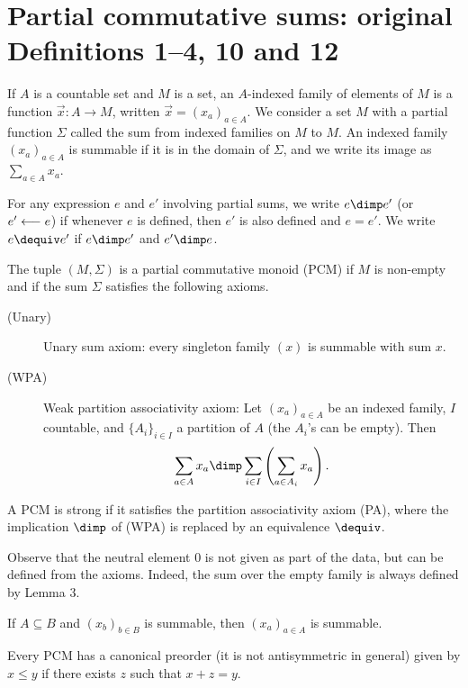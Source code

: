 \section*{Partial commutative sums: original Definitions 1--4, 10 and 12}
If $A$ is a countable set and $M$ is a set, an $A$-indexed family of elements of $M$ is a function $\vec x:A\to M$, written $\vec x=(x_a)_{a\in A}$. We consider a set $M$ with a partial function $\Sigma$ called the sum from indexed families on $M$ to $M$. An indexed family $(x_a)_{a\in A}$ is summable if it is in the domain of $\Sigma$, and we write its image as $\sum_{a\in A}x_a$.
\begin{originaldef}[1]
For any expression $e$ and $e'$ involving partial sums, we write $e\dimp e'$ (or $e'\mathrel{\leftarrow\joinrel\relbar}e$) if whenever $e$ is defined, then $e'$ is also defined and $e=e'$. We write $e\dequiv e'$ if $e\dimp e'$ and $e'\dimp e$.
\end{originaldef}
\begin{originaldef}
The tuple $(M,\Sigma)$ is a partial commutative monoid (PCM) if $M$ is non-empty and if the sum $\Sigma$ satisfies the following axioms.
\begin{description}
\item[(Unary)] Unary sum axiom: every singleton family $(x)$ is summable with sum $x$.
\item[(WPA)] Weak partition associativity axiom: Let $(x_a)_{a\in A}$ be an indexed family, $I$ countable, and $\{A_i\}_{i\in I}$ a partition of $A$ (the $A_i$'s can be empty). Then
\[\sum_{a\in A}x_a\dimp\sum_{i\in I}\left(\sum_{a\in A_i}x_a\right).\]
\end{description}
A PCM is strong if it satisfies the partition associativity axiom (PA), where the implication $\dimp$ of (WPA) is replaced by an equivalence $\dequiv$.
\end{originaldef}
Observe that the neutral element $0$ is not given as part of the data, but can be defined from the axioms. Indeed, the sum over the empty family is always defined by Lemma 3.
\begin{originallemma}[3] If $A\subseteq B$ and $(x_b)_{b\in B}$ is summable, then $(x_a)_{a\in A}$ is summable.\end{originallemma}
\begin{originaldef}[4] Every PCM has a canonical preorder (it is not antisymmetric in general) given by $x\leq y$ if there exists $z$ such that $x+z=y$.\end{originaldef}
